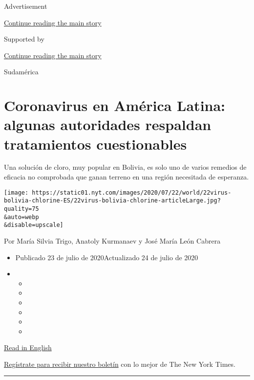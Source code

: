 Advertisement

\protect\hyperlink{after-top}{Continue reading the main story}

Supported by

\protect\hyperlink{after-sponsor}{Continue reading the main story}

Sudamérica

\hypertarget{coronavirus-en-amuxe9rica-latina-algunas-autoridades-respaldan-tratamientos-cuestionables}{%
\section{Coronavirus en América Latina: algunas autoridades respaldan
tratamientos
cuestionables}\label{coronavirus-en-amuxe9rica-latina-algunas-autoridades-respaldan-tratamientos-cuestionables}}

Una solución de cloro, muy popular en Bolivia, es solo uno de varios
remedios de eficacia no comprobada que ganan terreno en una región
necesitada de esperanza.

\texttt{[image: https://static01.nyt.com/images/2020/07/22/world/22virus-bolivia-chlorine-ES/22virus-bolivia-chlorine-articleLarge.jpg?quality=75\\\&auto=webp\\\&disable=upscale]}

Por María Silvia Trigo, Anatoly Kurmanaev y José María León Cabrera

\begin{itemize}
\item
  Publicado 23 de julio de 2020Actualizado 24 de julio de 2020
\item
  \begin{itemize}
  \item
  \item
  \item
  \item
  \item
  \item
  \end{itemize}
\end{itemize}

\href{https://www.nytimes.com/2020/07/23/world/americas/chlorine-coronavirus-bolivia-latin-america.html}{Read
in English}

\href{https://www.nytimes.com/newsletters/el-times}{Regístrate para
recibir nuestro boletín} con lo mejor de The New York Times.

\begin{center}\rule{0.5\linewidth}{\linethickness}\end{center}

